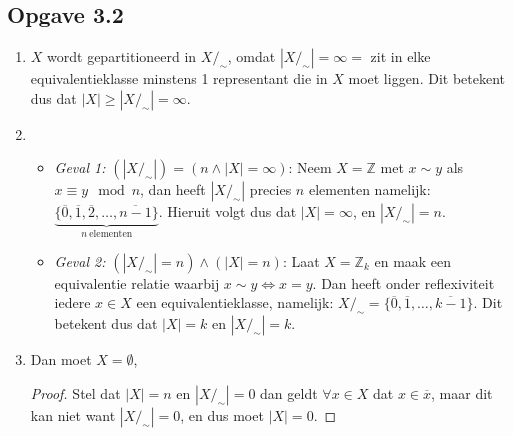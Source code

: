 \documentclass{article}
\newcommand{\Z}{\mathbb{Z}}
\newcommand{\q}{/_\sim}
\newcommand{\ol}[1]{\overline{#1}}
\begin{document}
\subsection*{Opgave 3.2}
\begin{enumerate}[label=\alph*)]
	\item $X$ wordt gepartitioneerd in $X/_\sim$, omdat $|X/_\sim| = \infty =$ zit in elke equivalentieklasse minstens 1 representant die in $X$ moet liggen. Dit betekent dus dat $|X| \geq |X/_\sim| = \infty$.
	\item
	      \begin{itemize}
		      \item \emph{Geval 1:} $(|X/_\sim|) = (n \wedge |X| = \infty)$:
		            Neem $X=\Z$ met $x \sim y$ als $x \equiv y \mod n$, dan
		            heeft $|X\q|$ precies $n$ elementen namelijk: $\underbrace{\{ \ol{0}, \ol{1}, \ol{2}, \dots ,\ol{n-1} \}}_{n\ \text{elementen}}$.
		            Hieruit volgt dus dat $|X| = \infty$, en $|X\q| = n$.
		      \item \emph{Geval 2:} $(|X\q|  = n) \wedge (|X| = n)$:
		            Laat $X = \Z_{k}$ en maak een equivalentie relatie waarbij $x \sim y \Longleftrightarrow x = y$.
		            Dan heeft onder reflexiviteit iedere $x \in X$ een equivalentieklasse,
		            namelijk: $X\q = \{\ol{0}, \ol{1}, \dots , \ol{k-1} \}$.
		            Dit betekent dus dat $|X| = k$ en $|X\q| = k$.
	      \end{itemize}
	\item
	      Dan moet $X = \emptyset$,
	      \begin{proof}
		      Stel dat $|X| = n$ en $|X\q| = 0$ dan geldt $\forall x \in
			      X$ dat $x \in \ol{x}$,
		      maar dit kan niet want $|X\q| = 0$, en dus
		      moet $|X| = 0$.
	      \end{proof}
\end{enumerate}
\end{document}
